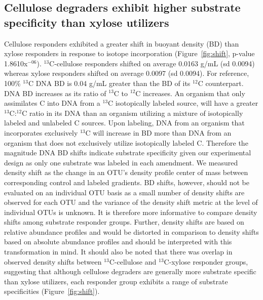 \subsection{Cellulose degraders exhibit higher substrate specificity than xylose
utilizers} 
Cellulose responders exhibited a greater shift in buoyant density (BD) than xylose
responders in response to isotope incorporation (Figure~\ref{fig:shift},
p-value 1.8610x$^{-06}$). $^{13}$C-cellulose responders shifted on average 0.0163
g/mL (sd 0.0094) whereas xylose responders shifted on average 0.0097 (sd
0.0094). For reference, 100\% $^{13}$C DNA BD is 0.04 g/mL greater than the BD
of its $^{12}$C counterpart. DNA BD increases as its ratio of $^{13}$C to
$^{12}$C increases. An organism that only assimilates C into DNA from a
$^{13}$C isotopically labeled source, will have a greater $^{13}$C:$^{12}$C
ratio in its DNA than an organism utilizing a mixture of isotopically labeled
and unlabeled C sources. Upon labeling, DNA from an organism that incorporates
exclusively $^{13}$C will increase in BD more than DNA from an
organism that does not exclusively utilize isotopically labeled C. Therefore
the magnitude DNA BD shifts indicate substrate specificity given
our experimental design as only one substrate was labeled in each amendment. We
measured density shift as the change in an OTU's density profile center of mass
between corresponding control and labeled gradients. BD shifts, however,
should not be evaluated on an individual OTU basis as a small number of density
shifts are observed for each OTU and the variance of the density shift metric
at the level of individual OTUs is unknown. It is therefore more informative to
compare density shifts among substrate responder groups. Further, density
shifts are based on relative abundance profiles and would be distorted
in comparison to density shifts based on absolute abundance profiles and
should be interpreted with this transformation in mind. It should also be noted
that there was overlap in observed density shifts between $^{13}$C-cellulose
and $^{13}$C-xylose responder groups, suggesting that although cellulose
degraders are generally more substrate specific than xylose utilizers, each responder group
exhibits a range of substrate specificities (Figure~\ref{fig:shift}).
